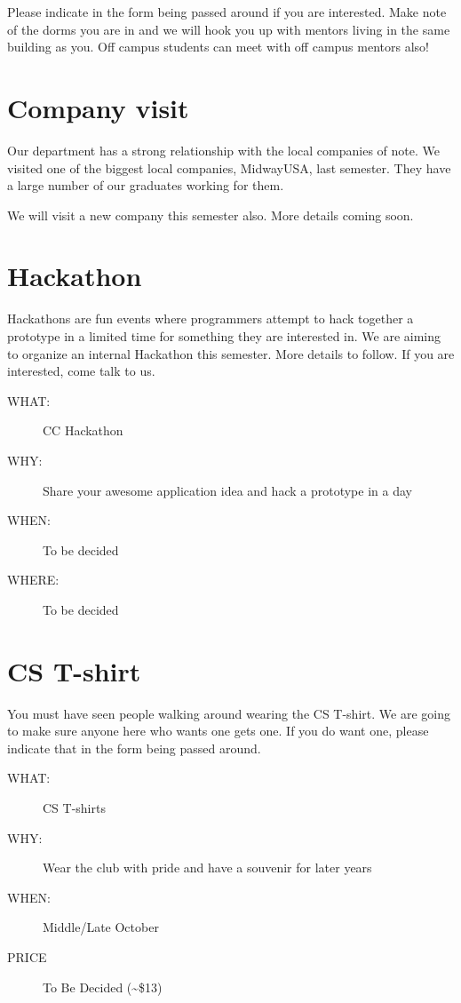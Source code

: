 Please indicate in the form being passed around if you are interested. Make
note of the dorms you are in and we will hook you up with mentors living in the
same building as you. Off campus students can meet with off campus mentors
also!


\newpage


\section{Company visit}
\label{sec:orgheadline13}

Our department has a strong relationship with the local companies of note. We
visited one of the biggest local companies, MidwayUSA, last semester. They have
a large number of our graduates working for them.

We will visit a new company this semester also. More details coming soon.


\newpage


\section{Hackathon}
\label{sec:orgheadline14}

Hackathons are fun events where programmers attempt to hack together a
prototype in a limited time for something they are interested in. We are aiming
to organize an internal Hackathon this semester. More details to follow. If you
are interested, come talk to us.

\begin{description}
\item[{WHAT:}] CC Hackathon
\item[{WHY:}] Share your awesome application idea and hack a prototype in a day
\item[{WHEN:}] To be decided
\item[{WHERE:}] To be decided
\end{description}


\newpage


\section{CS T-shirt}
\label{sec:orgheadline15}

You must have seen people walking around wearing the CS T-shirt. We are going
to make sure anyone here who wants one gets one. If you do want one, please
indicate that in the form being passed around.

\begin{description}
\item[{WHAT:}] CS T-shirts
\item[{WHY:}] Wear the club with pride and have a souvenir for later years
\item[{WHEN:}] Middle/Late October
\item[{PRICE}] To Be Decided (\textasciitilde{}\$13)
\end{description}


